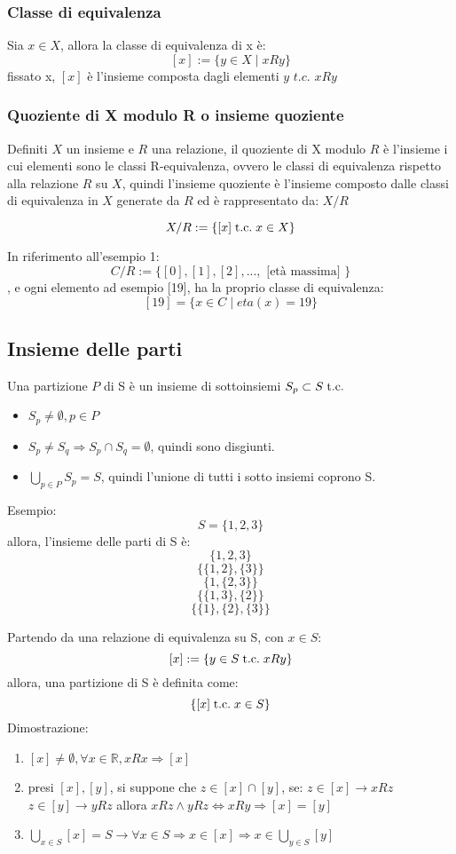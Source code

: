 \documentclass[a4paper,12pt]{article}
\newcommand{\rel}[1][R]{R}
\begin{document}
	\subsubsection{Classe di equivalenza}
	Sia $x \in X$, allora la classe di equivalenza di x è:
	\[
	[x] := \{y \in X \mid x \rel y\}
	\]
	fissato x, $[x]$ è l'insieme composta dagli elementi $y$ $t.c.$ $x \rel y$
	
	\subsubsection{Quoziente di X modulo R o insieme quoziente}
	Definiti $X$ un insieme e $\rel$ una relazione, il quoziente di X modulo $\rel$ è l'insieme i cui elementi sono le classi R-equivalenza, ovvero le classi di equivalenza rispetto alla relazione $\rel$ su $X$, quindi l'insieme quoziente è l'insieme composto dalle classi di equivalenza in $X$ generate da $\rel$ ed è rappresentato da: $X/R$
	
	\[
	X/R := \{[x] \;\text{t.c.}\; x \in X\}
	\]
	
	In riferimento all'esempio 1:
	\[
	C/R := \{[0], [1], [2], ... , \text{ [età massima] }\} %
	\], e ogni elemento ad esempio [19], ha la proprio classe di equivalenza:
	\[
	[19] = \{x \in C \mid eta(x) = 19\}
	\]
	
	\subsection{Insieme delle parti}
	Una partizione $P$ di S è un insieme di sottoinsiemi $S_p \subset S \;\text{t.c.}\;$
	\begin{itemize}
		\item $S_p \not = \emptyset, p \in P$
		\item $S_p \not = S_q \Rightarrow S_p \cap S_q = \emptyset$, quindi sono disgiunti.
		\item $\displaystyle \bigcup_{p \in P} S_p = S$, quindi l'unione di tutti i sotto insiemi coprono S.
	\end{itemize}
	
	Esempio:
	\[S = \{1,2,3\}\]
	allora, l'insieme delle parti di S è:
	\[\{1,2,3\}\]
	\[\{\{1,2\}, \{3\}\}\]
	\[\{1,\{2,3\}\}\]
	\[\{\{1,3\},\{2\}\}\]
	\[\{\{1\},\{2\},\{3\}\}\]
	
	Partendo da una relazione di equivalenza su S, con $x \in S$:
	\[[x] := \{y \in S \tc x \rel y\}\]
	allora, una partizione di S è definita come:
	\[\{[x] \;\text{t.c.}\; x \in S\}\]
	Dimostrazione:
	\begin{enumerate}
		\item $[x] \not = \emptyset, \forall x \in \mathbb{R}, x \rel x \Rightarrow [x]$
		\item presi $[x], [y]$, si suppone che $z \in [x] \cap [y]$, se:
		\subitem $z \in [x] \rightarrow x \rel z$
		\subitem $z \in [y] \rightarrow y \rel z$ \newline
		allora $x \rel z \wedge y \rel z \iff x \rel y \Rightarrow [x] = [y]$
		\item $\displaystyle \bigcup_{x \in S} [x] = S \rightarrow \forall x \in S \Rightarrow x \in [x] \Rightarrow x \in \bigcup_{y \in S} [y]$
	\end{enumerate}
	
\end{document}
